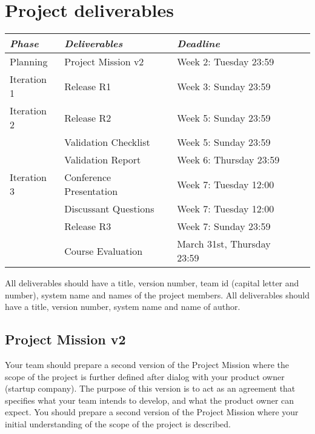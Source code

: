 \ifteknolog
\newcommand{\ITERATIONTHREE}{
 Iteration 3 & Conference Presentation & Week 7: Tuesday 12:00\\
      & Discussant Questions & Week 7: Tuesday 12:00\\
      & Release R3 & Week 7: Sunday 23:59\\
}
\else
\newcommand{\ITERATIONTHREE}{
    Iteration 3 & Release R3 & Week 7: Sunday 23:59\\
}
\fi

\ifteknolog
\newcommand{\PEERREVIEW}{}
\else
\newcommand{\PEERREVIEW}{
    & Peer Review & Week 3: Sunday 23:59\\
}
\fi


\section{Project deliverables}
\begin{tabular}{l |l p{5cm}  l}
{\it Phase} & {\it Deliverables} & {\it Deadline} \\
\hline
Planning & Project Mission v2& Week 2: Tuesday 23:59\\
Iteration 1 & Release R1 & Week 3: Sunday 23:59 \\
\PEERREVIEW
Iteration 2 & Release R2  & Week 5: Sunday 23:59\\
   & Validation Checklist & Week 5: Sunday 23:59\\
   & Validation Report & Week 6: Thursday 23:59\\
\ITERATIONTHREE
& Course Evaluation & March 31st, Thursday 23:59  \\

\end{tabular}
\vskip3mm

\ifteknolog
   \noindent All deliverables should have a title, version number, team id (capital letter and number), system name and names of the project members.
\else
   \noindent All deliverables should have a title, version number, system name and name of author.
\fi

\subsection{Project Mission v2}
\ifteknolog
   Your team should prepare a second version of the Project Mission where the scope of the project is further defined after dialog with your product owner (startup company). The purpose of this version is to act as an agreement that specifies what your team intends to develop, and what the product owner can expect.
\else
   You should prepare a second version of the Project Mission where your initial understanding of the scope of the project is described. 
\fi

